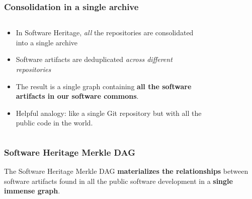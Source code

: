 \documentclass[aspectratio=169,xcolor=table]{beamer}
\begin{document}
    \begin{frame}
        \frametitle{Consolidation in a single archive}

        \begin{columns}
            \begin{block}{}
                \begin{itemize}
                    \item In Software Heritage, \emph{all} the repositories are
                        consolidated into a single archive
                    \item Software artifacts are deduplicated \emph{across
                        different repositories}
                    \item The result is a single graph containing \textbf{all
                        the software artifacts in our software commons}.
                    \item Helpful analogy: like a single Git repository but
                        with all the public code in the world.
                \end{itemize}
            \end{block}
            \begin{figure}
                \centering
                \scalebox{0.5}{}
            \end{figure}
        \end{columns}
    \end{frame}

    \begin{frame}
        \frametitle{Software Heritage Merkle DAG}
        \begin{block}{}
            The Software Heritage Merkle DAG \textbf{materializes the
            relationships} between software artifacts found in all the public
            software development in a \textbf{single immense graph}.
        \end{block}
        \vfill
        \begin{figure}
            \centering
            \scalebox{0.7}{}
        \end{figure}
    \end{frame}
\end{document}
